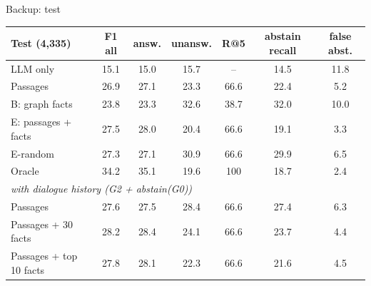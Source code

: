 \documentclass[aspectratio=169,11pt]{beamer}
\begin{document}
\begin{frame}{Backup: test}
\centering
\footnotesize
\begin{tabular}{lcccccc}
\toprule
Test (4,335) & F1 all & answ. & unansw. & R@5 & abstain recall & false abst. \\
\midrule
LLM only & 15.1 & 15.0 & 15.7 & -- & 14.5 & 11.8 \\ %
Passages & 26.9 & 27.1 & 23.3 & 66.6 & 22.4 & 5.2 \\ %
B: graph facts & 23.8 & 23.3 & 32.6 & 38.7 & 32.0 & 10.0 \\ %
E: passages + facts & 27.5 & 28.0 & 20.4 & 66.6 & 19.1 & 3.3 \\ %
E-random & 27.3 & 27.1 & 30.9 & 66.6 & 29.9 & 6.5 \\ %
Oracle & 34.2 & 35.1 & 19.6 & 100 & 18.7 & 2.4 \\ %
\midrule
\multicolumn{7}{l}{\emph{with dialogue history (G2 + abstain(G0))}} \\
Passages & 27.6 & 27.5 & 28.4 & 66.6 & 27.4 & 6.3 \\ %
Passages + 30 facts & 28.2 & 28.4 & 24.1 & 66.6 & 23.7 & 4.4 \\ %
Passages + top 10 facts & 27.8 & 28.1 & 22.3 & 66.6 & 21.6 & 4.5 \\ %
\bottomrule
\end{tabular}
\end{frame}
\end{document}
